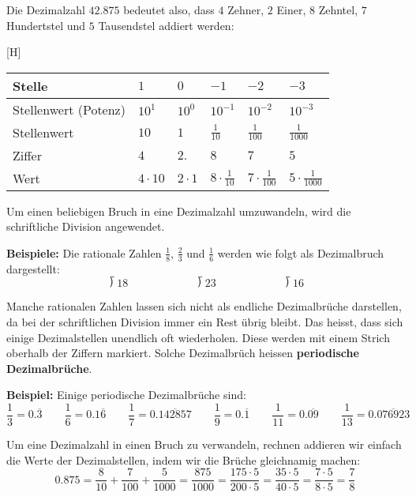 Die Dezimalzahl $42.875$ bedeutet also, dass $4$ Zehner, $2$ Einer, $8$ Zehntel, $7$ Hundertstel und $5$ Tausendstel addiert werden:
\begin{center}[H]
  \renewcommand{\arraystretch}{1.3}
  \begin{tabularx}{0.9\textwidth}{lCCCCC}
  \toprule
    Stelle & $1$ & $0$ & $-1$ & $-2$ & $-3$ \\
  \midrule
    Stellenwert (Potenz) & $10^{1}$ & $10^{0}$ & $10^{-1}$ & $10^{-2}$ & $10^{-3}$ \\
  \midrule
    Stellenwert & $10$ & $1$ & $\frac{1}{10}$ & $\frac{1}{100}$ & $\frac{1}{1000}$ \\
  \midrule
    Ziffer & $4$ & $2.$ & $8$ & $7$ & $5$ \\
  \midrule
    Wert & $4\cdot 10$ & $2\cdot 1$ & $8\cdot\frac{1}{10}$ & $7\cdot\frac{1}{100}$ & $5\cdot\frac{1}{1000}$ \\
  \bottomrule
  \end{tabularx}
\end{center}
Um einen beliebigen Bruch in eine Dezimalzahl umzuwandeln, wird die schriftliche Division angewendet.
\begin{example}
  \textbf{Beispiele:} Die rationale Zahlen $\frac{1}{8}$, $\frac{2}{3}$ und $\frac{1}{6}$ werden wie folgt als Dezimalbruch dargestellt:
  \[
    \longdivision{1}{8} \qquad\qquad\qquad \longdivision{2}{3} \qquad\qquad\qquad \longdivision{1}{6}
  \]
\end{example}
Manche rationalen Zahlen lassen sich nicht als endliche Dezimalbrüche darstellen, da bei der schriftlichen Division immer ein Rest übrig bleibt. Das heisst, dass sich einige Dezimalstellen unendlich oft wiederholen. Diese werden mit einem Strich oberhalb der Ziffern markiert. Solche Dezimalbrüch heissen \textbf{periodische Dezimalbrüche}.
\begin{example}
  \textbf{Beispiel:} Einige periodische Dezimalbrüche sind:
  \[
    \frac{1}{3} = 0.\overline{3} \qquad
    \frac{1}{6} = 0.1\overline{6} \qquad
    \frac{1}{7} = 0.\overline{142857} \qquad
    \frac{1}{9} = 0.\overline{1} \qquad
    \frac{1}{11} = 0.\overline{09} \qquad
    \frac{1}{13} = 0.\overline{076923}
  \]
\end{example}
Um eine Dezimalzahl in einen Bruch zu verwandeln, rechnen addieren wir einfach die Werte der Dezimalstellen, indem wir die Brüche gleichnamig machen:
\[
  0.875 = \frac{8}{10} + \frac{7}{100} + \frac{5}{1000} = \frac{875}{1000} =\frac{175\cdot 5}{200\cdot 5} = \frac{35\cdot 5}{40\cdot 5} = \frac{7\cdot 5}{8\cdot 5} = \frac{7}{8}
\]
